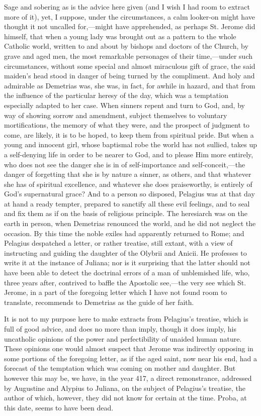 Sage and sobering as is the advice here given (and I wish I had
room to extract more of it), yet, I suppose, under the circumstances,
a calm looker-on might have thought it not uncalled for,—might have
apprehended, as perhaps St. Jerome did himself, that when a young lady
was brought out as a pattern to the whole Catholic world, written to
and about by bishops and doctors of the Church, by grave and aged men,
the most remarkable personages of their time,—under such
circumstances, without some special and almost miraculous gift of
grace, the said maiden's head stood in danger of being turned by the
compliment. And holy and admirable as Demetrias was, she was, in fact,
for awhile in hazard, and that from the influence of the particular
heresy of the day, which was a temptation especially adapted to her
case. When sinners repent and turn to God, and, by way of showing
sorrow and amendment, subject themselves to voluntary mortifications,
the memory of what they were, and the prospect of judgment to come,
are likely, it is to be hoped, to keep them from spiritual pride. But
when a young and innocent girl, whose baptismal robe the world has not
sullied, takes up a self-denying life in order to be nearer to God,
and to please Him more entirely, who does not see the danger she is in
of self-importance and self-conceit,—the danger of forgetting that
she is by nature a sinner, as others, and that whatever she has of
spiritual excellence, and whatever she does praiseworthy, is entirely
of God's supernatural grace? And to a person so disposed, Pelagius was
at that day at hand a ready tempter, prepared to sanctify all
these evil feelings, and to seal and fix them as if on the basis of
religious principle. The heresiarch was on the earth in person, when
Demetrias renounced the world, and he did not neglect the occasion. By
this time the noble exiles had apparently returned to Rome; and
Pelagius despatched a letter, or rather treatise, still extant, with a
view of instructing and guiding the daughter of the Olybrii and Anicii.
He professes to write it at the instance of Juliana; nor is it
surprising that the latter should not have been able to detect the
doctrinal errors of a man of unblemished life, who, three years after,
contrived to baffle the Apostolic see,—the very see which St.
Jerome, in a part of the foregoing letter which I have not found room
to translate, recommends to Demetrias as the guide of her faith.

It is not to my purpose here to make extracts from Pelagius's
treatise, which is full of good advice, and does no more than imply,
though it does imply, his uncatholic opinions of the power and
perfectibility of unaided human nature. These opinions one would
almost suspect that Jerome was indirectly opposing in some portions of
the foregoing letter, as if the aged saint, now near his end, had a
forecast of the temptation which was coming on mother and daughter.
But however this may be, we have, in the year 417, a direct
remonstrance, addressed by Augustine and Alypius to Juliana, on the
subject of Pelagius's treatise, the author of which, however, they did
not know for certain at the time. Proba, at this date, seems to have
been dead.

